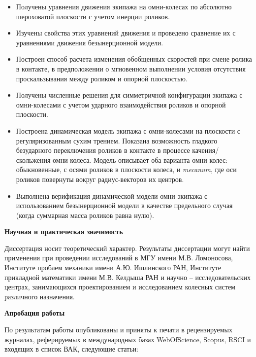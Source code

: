 \begin{itemize}

	\item Получены уравнения движения экипажа на омни-колесах по абсолютно шероховатой плоскости с учетом инерции роликов.

	\item Изучены свойства этих уравнений движения и проведено сравнение их с уравнениями движения безынерционной модели.

	\item Построен способ расчета изменения обобщенных скоростей при смене ролика в контакте, в предположении о мгновенном выполнении условия отсутствия проскальзывания между роликом и опорной плоскостью.

	\item Получены численные решения для симметричной конфигурации экипажа с омни-колесами с учетом ударного взаимодействия роликов и опорной плоскости.

	\item Построена динамическая модель экипажа с омни-колесами на плоскости с регуляризованным сухим трением. Показана возможность гладкого безударного переключения роликов в контакте в процессе качения/скольжения омни-колеса. Модель описывает оба варианта омни-колес: обыкновенные, с осями роликов в плоскости колеса, и \textit{mecanum}, где оси роликов повернуты вокруг радиус-векторов их центров.

	\item Выполнена верификация динамической модели омни-экипажа с использованием безынерционной модели в качестве предельного случая (когда суммарная масса роликов равна нулю).
\end{itemize}

\textbf{Научная и практическая значимость}

Диссертация носит теоретический характер. Результаты диссертации могут найти применения при проведении исследований в МГУ имени М.В. Ломоносова, Институте проблем механики имени А.Ю. Ишлинского РАН, Институте прикладной математики имени М.В. Келдыша РАН и научно -- исследовательских центрах, занимающихся проектированием и исследованием колесных систем различного назначения.

\textbf{Апробация работы}

По результатам работы опубликованы и приняты к печати в рецензируемых журналах, реферируемых в международных базах WebOfScience, Scopus, RSCI и входящих в список ВАК, следующие статьи: 

